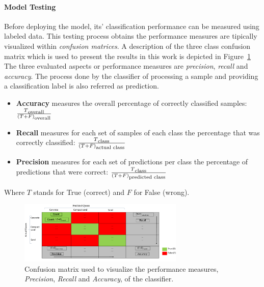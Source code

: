 \documentclass{article}
\begin{document}
\paragraph*{Model Testing}
Before deploying the model, its' classification performance can be measured using labeled data.
This testing process obtains the performance measures are tipically visualized within \emph{confusion matrices}. 
A description of the three class confusion matrix which is used to present the results in this work is depicted in Figure~\ref{fig:CMdescrpit}
The three evaluated aspects or performance measures are \emph{precision}, \emph{recall} and \emph{accuracy}.
The process done by the classifier of processing a sample and providing a classification label is also referred as prediction.
\begin{itemize}
\item \textbf{Accuracy} measures the overall percentage of correctly classified samples: $\frac{T\textsubscript{overall}}{(T+F)\textsubscript{overall}}$ 
\item \textbf{Recall} measures for each set of samples of each class the percentage that was correctly classified: $\frac{T\textsubscript{class}}{(T+F)\textsubscript{actual class}}$%
\item \textbf{Precision} measures for each set of predictions per class the percentage of predictions that were correct: $\frac{T\textsubscript{class}}{(T+F)\textsubscript{predicted class}}$%
\end{itemize}
Where $T$ stands for True (correct) and $F$ for False (wrong).

\begin{figure}[!htbp]
    \centering
    \includegraphics[width=0.7\textwidth]{../figures/CM_Description.pdf}
    \caption{\label{fig:CMdescrpit} Confusion matrix used to visualize the performance measures, \emph{Precision}, \emph{Recall} and \emph{Accuracy}, of the classifier.\cite{kuhr2021}}
\end{figure}
\end{document}
